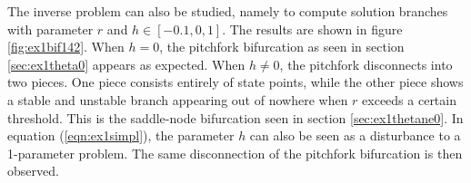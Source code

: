 \begin{figure}[htp]
\caption{}
\label{fig:ex1bif141}
\end{figure}
\hfill\newline
The inverse problem can also be studied, namely to compute solution branches with parameter $r$ and $h\in[-0.1,0,1]$. The results are shown in figure \ref{fig:ex1bif142}. When $h=0$, the pitchfork bifurcation as seen in section \ref{sec:ex1theta0} appears as expected. When $h\ne0$, the pitchfork disconnects into two pieces. One piece consists entirely of state points, while the other piece shows a stable and unstable branch appearing out of nowhere when $r$ exceeds a certain threshold. This is the saddle-node bifurcation seen in section \ref{sec:ex1thetane0}. In equation (\ref{eqn:ex1simpl}), the parameter $h$ can also be seen as a disturbance to a 1-parameter problem. The same disconnection of the pitchfork bifurcation is then observed.
